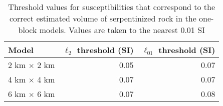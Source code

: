 \begin{table}
    \centering
        \caption{Threshold values for susceptibilities that correspond to the correct estimated volume of serpentinized rock in the one-block models. Values are taken to the nearest 0.01 SI}
        \begin{tabular}[htb]{| l | r | r |}
            \hline
            \textbf{Model} & \textbf{$\ell_2$ threshold (SI)} & \textbf{$\ell_{01}$ threshold (SI)} \\
            \hline
            2 km $\times$ 2 km & 0.05 & 0.07 \\
            4 km $\times$ 4 km & 0.07 & 0.07 \\
            6 km $\times$ 6 km & 0.07 & 0.08 \\
            \hline
        \end{tabular}
        \label{tab:one-block-susceptibility}
     \end{table}


